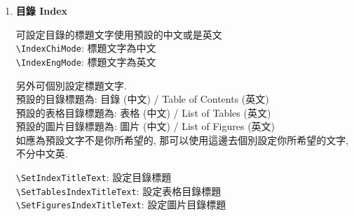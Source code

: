 \begin{enumerate}
{    而摘要中的關鍵字, 為了方便同學們能達到以下情況:\\
    a. 只寫中文版摘要\\
    b. 只寫英文版摘要\\
    c. 同時寫中英文版摘要\\
    故中英文版的關鍵字都是可個別設定.\\
    \verb|\SetAbstractChiKeywords|: 用來設定中文版摘要的關鍵字\\
    \verb|\SetAbstractEngKeywords|: 用來設定英文版摘要的關鍵字\\
    \verb|\SetAbstractExtKeywords|: 用來設定英文延伸摘要的關鍵字 (只有你要編寫英文延伸摘要才需要設定)\\
    所以只要使用你需要寫的版本則可. 但如果2個版本都要寫, 則2個都同時使用則可. 沒有填寫的話, 則摘要中的關鍵字部份是不會顯示出來.

    e.g\\
    \verb|\SetAbstractChiKeywords|{關鍵字 A}{關鍵字 B}{關鍵字 C}\\
    \verb|\SetAbstractEngKeywords|{Keyword A}{Keyword B}{Keyword C}\\
    \verb|\SetAbstractExtKeywords|{Keyword A}{Keyword B}{Keyword C}\\
    英文延伸摘要的關鍵字理應會跟英文版摘要的關鍵字是一樣, 但為了同學能編寫不同內容和關鍵字, 故可獨立設定.
  } %

  \item
  {
    \textbf{目錄 Index}

    可設定目錄的標題文字使用預設的中文或是英文\\
    \verb|\IndexChiMode|:  標題文字為中文\\
    \verb|\IndexEngMode|:  標題文字為英文

    另外可個別設定標題文字.\\
    預設的目錄標題為: 目錄 (中文) / Table of Contents (英文)\\
    預設的表格目錄標題為: 表格 (中文) / List of Tables (英文)\\
    預設的圖片目錄標題為: 圖片 (中文) / List of Figures (英文)\\
    如應為預設文字不是你所希望的, 那可以使用這邊去個別設定你所希望的文字, 不分中文英.

    \verb|\SetIndexTitleText|: 設定目錄標題\\
    \verb|\SetTablesIndexTitleText|: 設定表格目錄標題\\
    \verb|\SetFiguresIndexTitleText|: 設定圖片目錄標題
  } %


\end{enumerate}
